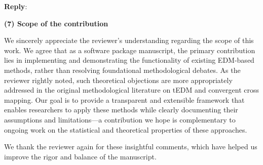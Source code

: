 \documentclass[11pt]{article}
\newcounter{reviewer}
\newenvironment{reply}
   {\medskip \noindent \color{blue} \begin{sf}\textbf{Reply}:\  }
   {\medskip \par \end{sf}}
\begin{document}
\begin{reply}
\vspace{0.5em}

\textbf{(7) Scope of the contribution}

We sincerely appreciate the reviewer's understanding regarding the scope of this work. We agree that as a software package manuscript, the primary contribution lies in implementing and demonstrating the functionality of existing EDM-based methods, rather than resolving foundational methodological debates. As the reviewer rightly noted, such theoretical objections are more appropriately addressed in the original methodological literature on tEDM and convergent cross mapping. Our goal is to provide a transparent and extensible framework that enables researchers to apply these methods while clearly documenting their assumptions and limitations---a contribution we hope is complementary to ongoing work on the statistical and theoretical properties of these approaches.

\vspace{0.5em}

We thank the reviewer again for these insightful comments, which have helped us improve the rigor and balance of the manuscript.

\end{reply}

\baselineskip12pt
 
 
\end{document}

